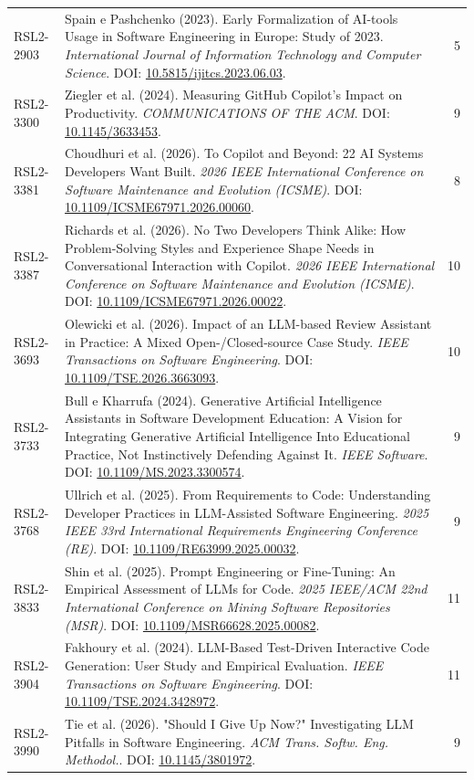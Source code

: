 \begin{small}
\begin{longtable}{lp{11.2cm}r}
RSL2-2903 & Spain e Pashchenko (2023). Early Formalization of AI-tools Usage in Software Engineering in Europe: Study of 2023. \textit{International Journal of Information Technology and Computer Science}. DOI: \url{10.5815/ijitcs.2023.06.03}. & 5 \\
RSL2-3300 & Ziegler et al. (2024). Measuring GitHub Copilot's Impact on Productivity. \textit{COMMUNICATIONS OF THE ACM}. DOI: \url{10.1145/3633453}. & 9 \\
RSL2-3381 & Choudhuri et al. (2026). To Copilot and Beyond: 22 AI Systems Developers Want Built. \textit{2026 IEEE International Conference on Software Maintenance and Evolution (ICSME)}. DOI: \url{10.1109/ICSME67971.2026.00060}. & 8 \\
RSL2-3387 & Richards et al. (2026). No Two Developers Think Alike: How Problem-Solving Styles and Experience Shape Needs in Conversational Interaction with Copilot. \textit{2026 IEEE International Conference on Software Maintenance and Evolution (ICSME)}. DOI: \url{10.1109/ICSME67971.2026.00022}. & 10 \\
RSL2-3693 & Olewicki et al. (2026). Impact of an LLM-based Review Assistant in Practice: A Mixed Open-/Closed-source Case Study. \textit{IEEE Transactions on Software Engineering}. DOI: \url{10.1109/TSE.2026.3663093}. & 10 \\
RSL2-3733 & Bull e Kharrufa (2024). Generative Artificial Intelligence Assistants in Software Development Education: A Vision for Integrating Generative Artificial Intelligence Into Educational Practice, Not Instinctively Defending Against It. \textit{IEEE Software}. DOI: \url{10.1109/MS.2023.3300574}. & 9 \\
RSL2-3768 & Ullrich et al. (2025). From Requirements to Code: Understanding Developer Practices in LLM-Assisted Software Engineering. \textit{2025 IEEE 33rd International Requirements Engineering Conference (RE)}. DOI: \url{10.1109/RE63999.2025.00032}. & 9 \\
RSL2-3833 & Shin et al. (2025). Prompt Engineering or Fine-Tuning: An Empirical Assessment of LLMs for Code. \textit{2025 IEEE/ACM 22nd International Conference on Mining Software Repositories (MSR)}. DOI: \url{10.1109/MSR66628.2025.00082}. & 11 \\
RSL2-3904 & Fakhoury et al. (2024). LLM-Based Test-Driven Interactive Code Generation: User Study and Empirical Evaluation. \textit{IEEE Transactions on Software Engineering}. DOI: \url{10.1109/TSE.2024.3428972}. & 11 \\
RSL2-3990 & Tie et al. (2026). "Should I Give Up Now?" Investigating LLM Pitfalls in Software Engineering. \textit{ACM Trans. Softw. Eng. Methodol.}. DOI: \url{10.1145/3801972}. & 9 \\

\end{longtable}
\end{small}
